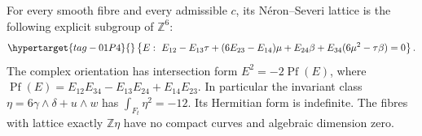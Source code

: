 \begin{proposition}\hypertarget{tag-01QU}{}\label{fam:src:D.1.4}\label{fam:st:D.1.4}

For every smooth fibre and every admissible \(c\), its N\'eron--Severi lattice
is the following explicit subgroup of \(\mathbb Z^6\):
\begin{equation}\hypertarget{tag-01P4}{}\label{fam:eq:cd-NS}
 \left\{E:\ E_{12}-E_{13}\tau+(6E_{23}-E_{14})\mu+
 E_{24}\beta+E_{34}(6\mu^2-\tau\beta)=0\right\}.
\end{equation}
The complex orientation has intersection form
\(E^2=-2\operatorname{Pf}(E)\), where
\(\operatorname{Pf}(E)=E_{12}E_{34}-E_{13}E_{24}+E_{14}E_{23}\).
In particular the invariant class \(\eta=6\gamma\wedge\delta+u\wedge w\)
has \(\int_{F_t}\eta^2=-12\). Its Hermitian form is indefinite.
The fibres with lattice exactly \(\mathbb Z\eta\) have no compact curves
and algebraic dimension zero.
\end{proposition}


